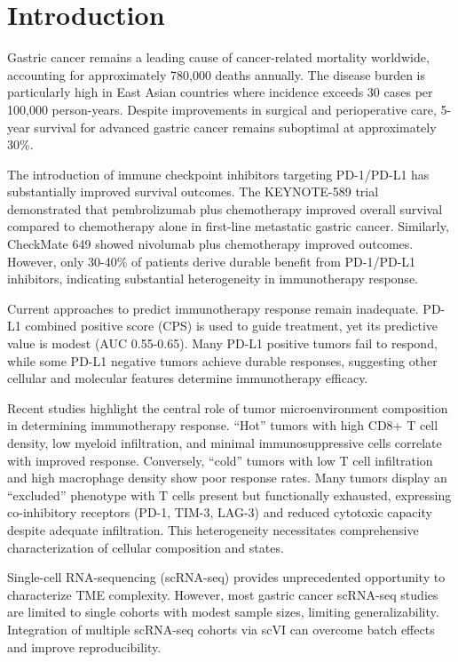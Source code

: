 \documentclass[12pt,twoside]{article}
\begin{document}

\section{Introduction}

Gastric cancer remains a leading cause of cancer-related mortality worldwide, accounting for approximately 780,000 deaths annually. The disease burden is particularly high in East Asian countries where incidence exceeds 30 cases per 100,000 person-years. Despite improvements in surgical and perioperative care, 5-year survival for advanced gastric cancer remains suboptimal at approximately 30\%.

The introduction of immune checkpoint inhibitors targeting PD-1/PD-L1 has substantially improved survival outcomes. The KEYNOTE-589 trial demonstrated that pembrolizumab plus chemotherapy improved overall survival compared to chemotherapy alone in first-line metastatic gastric cancer. Similarly, CheckMate 649 showed nivolumab plus chemotherapy improved outcomes. However, only 30-40\% of patients derive durable benefit from PD-1/PD-L1 inhibitors, indicating substantial heterogeneity in immunotherapy response.

Current approaches to predict immunotherapy response remain inadequate. PD-L1 combined positive score (CPS) is used to guide treatment, yet its predictive value is modest (AUC 0.55-0.65). Many PD-L1 positive tumors fail to respond, while some PD-L1 negative tumors achieve durable responses, suggesting other cellular and molecular features determine immunotherapy efficacy.

Recent studies highlight the central role of tumor microenvironment composition in determining immunotherapy response. ``Hot'' tumors with high CD8+ T cell density, low myeloid infiltration, and minimal immunosuppressive cells correlate with improved response. Conversely, ``cold'' tumors with low T cell infiltration and high macrophage density show poor response rates. Many tumors display an ``excluded'' phenotype with T cells present but functionally exhausted, expressing co-inhibitory receptors (PD-1, TIM-3, LAG-3) and reduced cytotoxic capacity despite adequate infiltration. This heterogeneity necessitates comprehensive characterization of cellular composition and states.

Single-cell RNA-sequencing (scRNA-seq) provides unprecedented opportunity to characterize TME complexity. However, most gastric cancer scRNA-seq studies are limited to single cohorts with modest sample sizes, limiting generalizability. Integration of multiple scRNA-seq cohorts via scVI can overcome batch effects and improve reproducibility.
\end{document}
